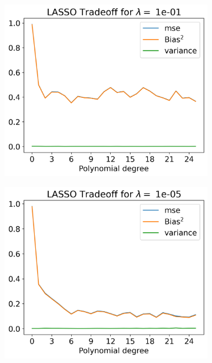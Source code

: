 \documentclass[12pt]{article}
\begin{document}
\begin{figure}[H]
  \begin{subfigure}{.5\textwidth}
    \centering
    \includegraphics[width=\textwidth]{../figures/tradeoff_LASSO_1e-01real.png}
    \caption{}
    \label{fig:}
  \end{subfigure}
  \begin{subfigure}{.5\textwidth}
    \centering
    \includegraphics[width=\textwidth]{../figures/tradeoff_LASSO_1e-05real.png}
    \caption{}
    \label{fig:}
  \end{subfigure}

\end{figure}
\end{document}
